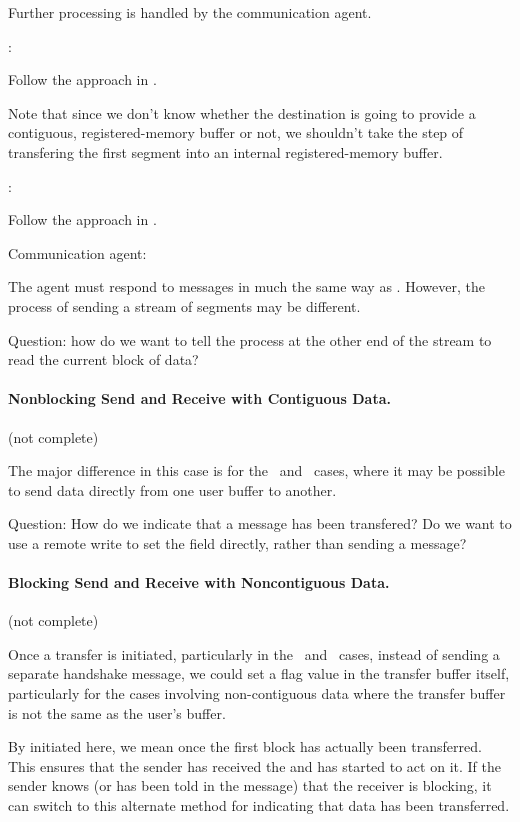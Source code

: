 \begin{mmadi}
\begin{via}
Further processing is handled by the communication agent.

:

Follow the approach in \tcpname.

Note that since we don't know whether the destination is going to provide a
contiguous, registered-memory buffer or not, we shouldn't take the step of
transfering the first segment into an internal registered-memory buffer.

:

Follow the approach in \tcpname.  

Communication agent:

The agent must respond to messages in much the same way as \tcpname.  However,
the process of sending a stream of segments may be different. 

Question: how do we want to tell the process at the other end of the stream to
read the current block of data?

\end{via}
\end{mmadi}

\paragraph{Nonblocking Send and Receive with Contiguous Data.}
(not complete)

The major difference in this case is for the \shmemname\ and \vianame\ cases,
where it may be possible to send data directly from one user buffer to
another.  

\begin{via}
  Question: How do we indicate that a message has been transfered?  Do we want
  to use a remote write to set the  field
  directly, rather than sending a message?

\end{via}

\paragraph{Blocking Send and Receive with Noncontiguous Data.}
\label{sec:blocking-optimization}
(not complete)

Once a transfer is initiated, particularly in the \shmemname\ and \vianame\
cases, instead of sending a separate handshake message, we could set a flag
value in the transfer buffer itself, particularly for the cases involving
non-contiguous data where the transfer buffer is not the same as the user's
buffer.  

By initiated here, we mean once the first block has actually been
transferred.  This ensures that the sender has received the
 and has started to act on it.  If the sender
knows (or has been told in the \mpidconst{MPID_Hid_ok_to_send} message) that
the receiver is blocking, it can switch to this alternate method for
indicating that data has been transferred.
